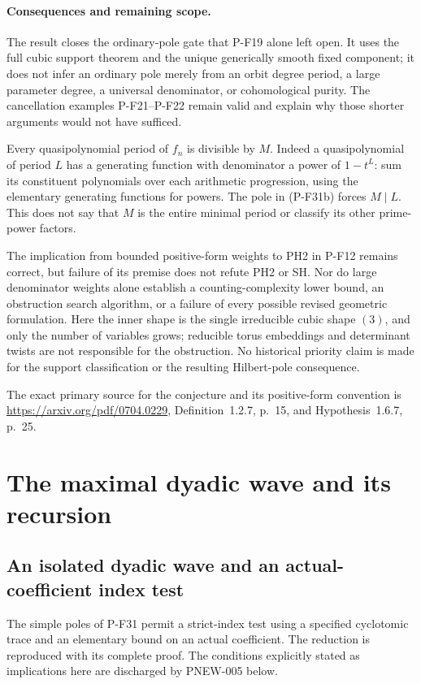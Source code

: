 \paragraph{Consequences and remaining scope.}
The result closes the ordinary-pole gate that P-F19 alone
left open. It uses the full cubic support theorem and the
unique generically smooth fixed component; it does not
infer an ordinary pole merely from an orbit degree period,
a large parameter degree, a universal denominator, or
cohomological purity. The cancellation examples P-F21--P-F22
remain valid and explain why those shorter arguments
would not have sufficed.

Every quasipolynomial period of $f_n$ is divisible by $M$.
Indeed a quasipolynomial of period $L$ has a generating
function with denominator a power of $1-t^L$: sum its
constituent polynomials over each arithmetic progression,
using the elementary generating functions for powers.
The pole in (P-F31b) forces $M\mid L$. This does not say
that $M$ is the entire minimal period or classify its
other prime-power factors.

The implication from bounded positive-form weights to
PH2 in P-F12 remains correct, but failure of its premise
does not refute PH2 or SH. Nor do large denominator
weights alone establish a counting-complexity lower bound,
an obstruction search algorithm, or a failure of every
possible revised geometric formulation. Here the inner
shape is the single irreducible cubic shape $(3)$, and
only the number of variables grows; reducible torus
embeddings and determinant twists are not responsible
for the obstruction. No historical priority claim is
made for the support classification or the resulting
Hilbert-pole consequence.

The exact primary source for the conjecture and its
positive-form convention is
\url{https://arxiv.org/pdf/0704.0229},
Definition~1.2.7, p.~15, and Hypothesis~1.6.7, p.~25.


\section{The maximal dyadic wave and its recursion}

\subsection{An isolated dyadic wave and an actual-coefficient index test}

The simple poles of P-F31 permit a strict-index test using a specified
cyclotomic trace and an elementary bound on an actual coefficient.
The reduction is reproduced with its complete proof.  The conditions
explicitly stated as implications here are discharged by PNEW-005 below.

